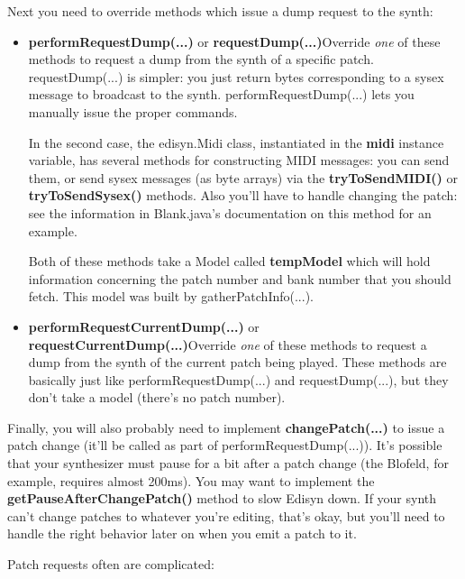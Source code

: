 \documentclass{article}
\begin{document}
Next you need to override methods which issue a dump request to the synth:

\begin{itemize}
\item {\bf performRequestDump(...)} or {\bf requestDump(...)}\quad Override {\it one} of these methods to request a dump from the synth of a specific patch.  requestDump(...) is simpler: you just return bytes corresponding to a sysex message to broadcast to the synth.  performRequestDump(...) lets you manually issue the proper commands. 

In the second case, the edisyn.Midi class, instantiated in the {\bf midi} instance variable, has several methods for constructing MIDI messages: you can send them, or send sysex messages (as byte arrays) via the {\bf tryToSendMIDI()} or {\bf tryToSendSysex()} methods.  Also you'll have to handle changing the patch: see the information in Blank.java's documentation on this method for an example.

Both of these methods take a Model called {\bf tempModel} which will hold information concerning the patch number and bank number that you should fetch.  This model was built by gatherPatchInfo(...).

\item {\bf performRequestCurrentDump(...)} or {\bf requestCurrentDump(...)}\quad Override {\it one} of these methods to request a dump from the synth of the current patch being played.  These methods are basically just like performRequestDump(...) and requestDump(...), but they don't take a model (there's no patch number).
\end{itemize}

Finally, you will also probably need to implement {\bf changePatch(...)} to issue a patch change (it'll be called as part of performRequestDump(...)).    It's possible that your synthesizer must pause for a bit after a patch change (the Blofeld, for example, requires almost 200ms).  You may want to implement the {\bf getPauseAfterChangePatch()} method to slow Edisyn down.  If your synth can't change patches to whatever you're editing, that's okay, but you'll need to handle the right behavior later on when you emit a patch to it.

Patch requests often are complicated:
\end{document}
